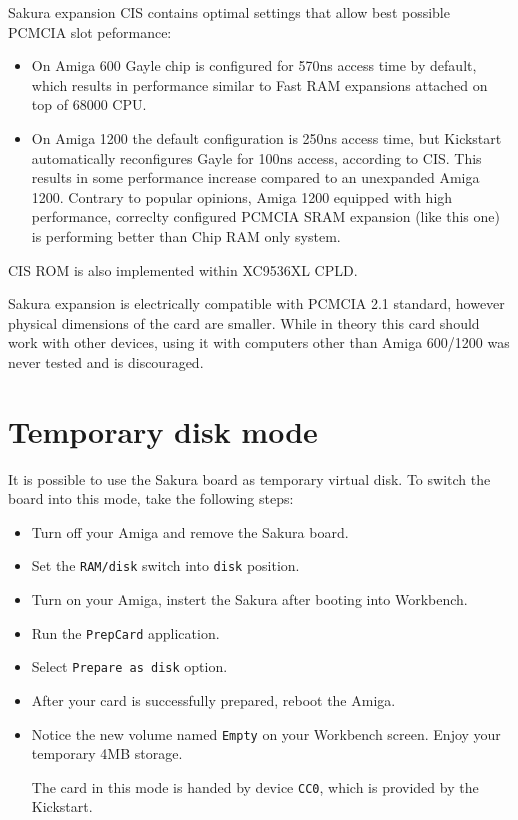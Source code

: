 \documentclass[10pt,a5paper]{article}
\begin{document}
Sakura expansion CIS contains optimal settings that allow best possible PCMCIA slot peformance:
\begin{itemize}
	\item On Amiga 600 Gayle chip is configured for 570ns access time by default, which results in performance similar to Fast RAM expansions attached on top of 68000 CPU.
	\item On Amiga 1200 the default configuration is 250ns access time, but Kickstart automatically reconfigures Gayle for 100ns access, according to CIS. This results in some performance increase compared to an unexpanded Amiga 1200. Contrary to popular opinions, Amiga 1200 equipped with high performance, correclty configured PCMCIA SRAM expansion (like this one) is performing better than Chip RAM only system.
\end{itemize}

CIS ROM is also implemented within XC9536XL CPLD.

Sakura expansion is electrically compatible with PCMCIA 2.1 standard, however physical dimensions of the card are smaller. While in theory this card should work with other devices, using it with computers other than Amiga 600/1200 was never tested and is discouraged.

\section*{Temporary disk mode}

It is possible to use the Sakura board as temporary virtual disk. To switch the board into this mode, take the following steps:
\begin{itemize}
	\item Turn off your Amiga and remove the Sakura board.
	\item Set the {\tt RAM/disk} switch into {\tt disk} position.
	\item Turn on your Amiga, instert the Sakura after booting into Workbench.
	\item Run the {\tt PrepCard} application.
	\item Select {\tt Prepare as disk} option.
	\item After your card is successfully prepared, reboot the Amiga.
	\item Notice the new volume named {\tt Empty} on your Workbench screen. Enjoy your temporary 4MB storage.

The card in this mode is handed by device {\tt CC0}, which is provided by the Kickstart.
\end{itemize}
\end{document}

